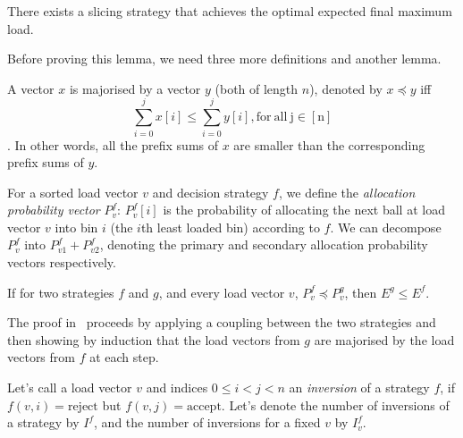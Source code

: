 \begin{lemma} \label{lemma: thresholdproperty}
There exists a slicing strategy that achieves the optimal expected final maximum load.
\end{lemma}


Before proving this lemma, we need three more definitions and another lemma.


\begin{definition} [majorisation]
A vector $x$ is majorised by a vector $y$ (both of length $n$), denoted by $x \preccurlyeq y$ iff $$\sum_{i=0}^j x[i] \leq \sum_{i=0}^j y[i]\mathrm{, for\ all\ j\in [n]}$$. In other words, all the prefix sums of $x$ are smaller than the corresponding prefix sums of $y$.
\end{definition}


\begin{definition} 
For a sorted load vector $v$ and decision strategy $f$, we define the \textit{allocation probability vector} $P^f_v$: $P^f_v[i]$ is the probability of allocating the next ball at load vector $v$ into bin $i$ (the $i$th least loaded bin) according to $f$. We can decompose $P^f_v$ into $P^f_{v1}+P^f_{v2}$, denoting the primary and secondary allocation probability vectors respectively.
\end{definition}


\begin{lemma}  \label{lemma: majorisation-implies-better}
If for two strategies $f$ and $g$, and every load vector $v$, $P^f_v\preccurlyeq P^g_v$, then $E^g\leq E^f$.
\end{lemma}

\begin{remark}
The proof in~\cite{azar1999twochoice} proceeds by applying a coupling between the two strategies and then showing by induction that the load vectors from $g$ are majorised by the load vectors from $f$ at each step.
\end{remark}


\begin{definition} [inversions]
Let's call a load vector $v$ and indices $0\leq i<j<n$ an \textit{inversion} of a strategy $f$, if $f(v,i)=\mathrm{reject}$ but $f(v,j)=\mathrm{accept}$. Let's denote the number of inversions of a strategy by $I^f$, and the number of inversions for a fixed $v$ by $I^f_v$.
\end{definition}


